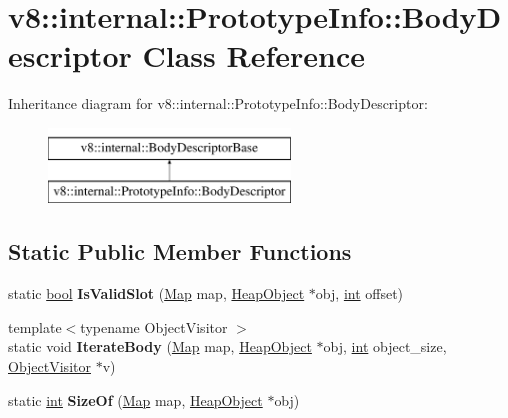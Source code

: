 \hypertarget{classv8_1_1internal_1_1PrototypeInfo_1_1BodyDescriptor}{}\section{v8\+:\+:internal\+:\+:Prototype\+Info\+:\+:Body\+Descriptor Class Reference}
\label{classv8_1_1internal_1_1PrototypeInfo_1_1BodyDescriptor}
Inheritance diagram for v8\+:\+:internal\+:\+:Prototype\+Info\+:\+:Body\+Descriptor\+:\begin{figure}[H]
\begin{center}
\leavevmode
\includegraphics[height=2.000000cm]{classv8_1_1internal_1_1PrototypeInfo_1_1BodyDescriptor}
\end{center}
\end{figure}
\subsection*{Static Public Member Functions}
\begin{DoxyCompactItemize}
\item 
\mbox{\label{classv8_1_1internal_1_1PrototypeInfo_1_1BodyDescriptor_a0f99e36c18a7209568f29e108a31b20f}} 
static \mbox{\hyperlink{classbool}{bool}} {\bfseries Is\+Valid\+Slot} (\mbox{\hyperlink{classv8_1_1internal_1_1Map}{Map}} map, \mbox{\hyperlink{classv8_1_1internal_1_1HeapObject}{Heap\+Object}} $\ast$obj, \mbox{\hyperlink{classint}{int}} offset)
\item 
\mbox{\label{classv8_1_1internal_1_1PrototypeInfo_1_1BodyDescriptor_afd00ec6c43db74b4d5885c29dc778880}} 
{\footnotesize template$<$typename Object\+Visitor $>$ }\\static void {\bfseries Iterate\+Body} (\mbox{\hyperlink{classv8_1_1internal_1_1Map}{Map}} map, \mbox{\hyperlink{classv8_1_1internal_1_1HeapObject}{Heap\+Object}} $\ast$obj, \mbox{\hyperlink{classint}{int}} object\+\_\+size, \mbox{\hyperlink{classv8_1_1internal_1_1ObjectVisitor}{Object\+Visitor}} $\ast$v)
\item 
\mbox{\label{classv8_1_1internal_1_1PrototypeInfo_1_1BodyDescriptor_a07989422020520c687bf844a77d07206}} 
static \mbox{\hyperlink{classint}{int}} {\bfseries Size\+Of} (\mbox{\hyperlink{classv8_1_1internal_1_1Map}{Map}} map, \mbox{\hyperlink{classv8_1_1internal_1_1HeapObject}{Heap\+Object}} $\ast$obj)
\end{DoxyCompactItemize}
